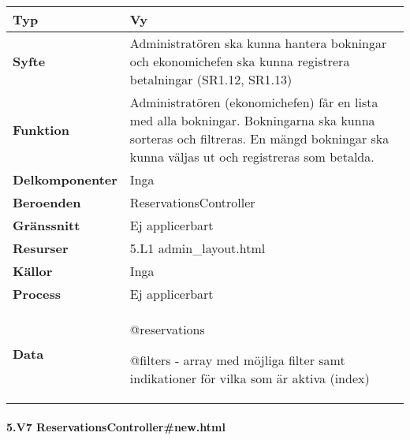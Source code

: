 \documentclass[a4paper, twoside, 11pt, titlepage]{article}
\begin{document}
			\begin {table} [ht] \begin{tabular} {  p{3.5cm} p{11.6cm} }
				\hline
				{\sffamily\textbf{Typ}} & {Vy} \\
				\hline
				{\sffamily\textbf{Syfte}} & {Administratören ska kunna hantera bokningar och ekonomichefen ska kunna registrera betalningar (SR1.12, SR1.13)} \\
				\hline
				{\sffamily\textbf{Funktion}} & {Administratören (ekonomichefen) får en lista med alla bokningar. Bokningarna ska kunna sorteras och filtreras. En mängd bokningar ska kunna väljas ut och registreras som betalda.} \\
				\hline
				{\sffamily\textbf{Delkomponenter}} & {Inga} \\
				\hline
				{\sffamily\textbf{Beroenden}} & {ReservationsController} \\
				\hline
				{\sffamily\textbf{Gränssnitt}} & {Ej applicerbart} \\
				\hline
				{\sffamily\textbf{Resurser}} & {5.L1 admin\_layout.html} \\
				\hline
				{\sffamily\textbf{Källor}} & {Inga} \\
				\hline
				{\sffamily\textbf{Process}} & {Ej applicerbart} \\
				\hline
				{\sffamily\textbf{Data}} & {@reservations

@filters - array med möjliga filter samt indikationer för vilka som är aktiva (index)} \\
				\hline
			\end{tabular} \end{table} \FloatBarrier


			\paragraph{5.V7 ReservationsController\#new.html}\
\end{document}
